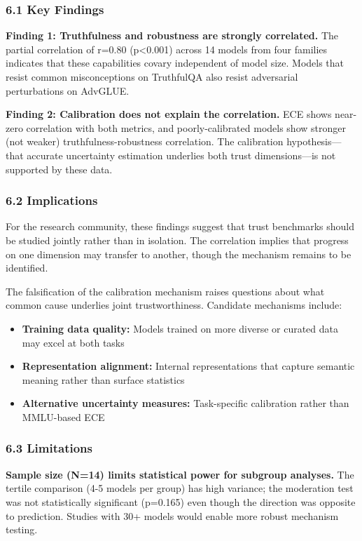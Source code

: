 
\subsubsection{6.1 Key Findings}

\textbf{Finding 1: Truthfulness and robustness are strongly correlated.} The partial correlation of r=0.80 (p<0.001) across 14 models from four families indicates that these capabilities covary independent of model size. Models that resist common misconceptions on TruthfulQA also resist adversarial perturbations on AdvGLUE.

\textbf{Finding 2: Calibration does not explain the correlation.} ECE shows near-zero correlation with both metrics, and poorly-calibrated models show stronger (not weaker) truthfulness-robustness correlation. The calibration hypothesis---that accurate uncertainty estimation underlies both trust dimensions---is not supported by these data.

\subsubsection{6.2 Implications}

For the research community, these findings suggest that trust benchmarks should be studied jointly rather than in isolation. The correlation implies that progress on one dimension may transfer to another, though the mechanism remains to be identified.

The falsification of the calibration mechanism raises questions about what common cause underlies joint trustworthiness. Candidate mechanisms include:
\begin{itemize}
\item \textbf{Training data quality:} Models trained on more diverse or curated data may excel at both tasks
\item \textbf{Representation alignment:} Internal representations that capture semantic meaning rather than surface statistics
\item \textbf{Alternative uncertainty measures:} Task-specific calibration rather than MMLU-based ECE
\end{itemize}

\subsubsection{6.3 Limitations}

\textbf{Sample size (N=14) limits statistical power for subgroup analyses.} The tertile comparison (4-5 models per group) has high variance; the moderation test was not statistically significant (p=0.165) even though the direction was opposite to prediction. Studies with 30+ models would enable more robust mechanism testing.


